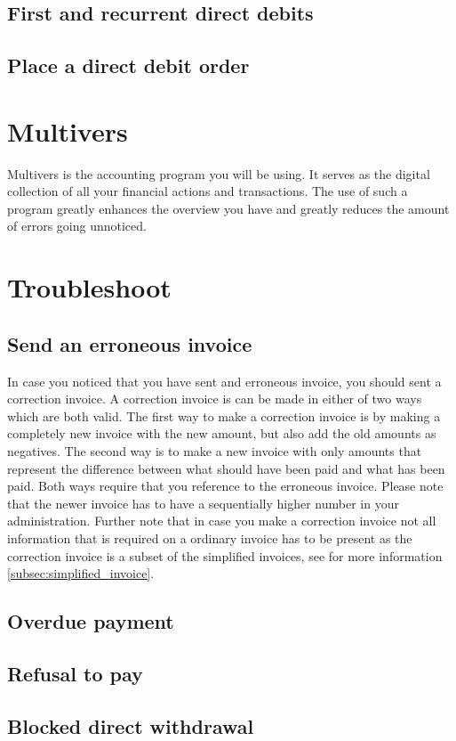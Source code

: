 \documentclass{report}
\begin{document}
\subsection{First and recurrent direct debits}
\subsection{Place a direct debit order}
\section{Multivers}
Multivers is the accounting program you will be using. It serves as the digital collection of all your financial actions and transactions. The use of such a program greatly enhances the overview you have and greatly reduces the amount of errors going unnoticed.
\section{Troubleshoot}
\subsection{Send an erroneous invoice}
In case you noticed that you have sent and erroneous invoice, you should sent a correction invoice. A correction invoice is can be made in either of two ways which are both valid. 
The first way to make a correction invoice is by making a completely new invoice with the new amount, but also add the old amounts as negatives.
The second way is to make a new invoice with only amounts that represent the difference between what should have been paid and what has been paid. 
Both ways require that you reference to the erroneous invoice. Please note that the newer invoice has to have a sequentially higher number in your administration. Further note that in case you make a correction invoice not all information that is required on a ordinary invoice has to be present as the correction invoice is a subset of the simplified invoices, see for more information \ref{subsec:simplified_invoice}.

\subsection{Overdue payment}
\subsection{Refusal to pay}
\subsection{Blocked direct withdrawal}
\end{document}
